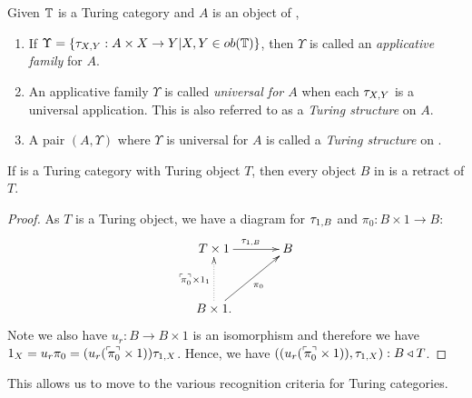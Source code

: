 \begin{definition}\label{def:turing_structure}
  Given $\mathbb{T}$ is a Turing category and $A$ is an object of \T,
  \begin{enumerate}
    \item If $\Upsilon=\{\tau_{{X},{Y}}: A\times X \to Y | X,Y \in ob(\mathbb{T})\}$, then $\Upsilon$ is called an
      \emph{applicative family} for $A$.
    \item An applicative family $\Upsilon$ is called \emph{universal for $A$} when each $\tau_{{X},{Y}}$ is
      a universal application. This is also referred to as a \emph{Turing structure} on $A$.
    \item A pair $(A,\Upsilon)$ where $\Upsilon$ is universal for $A$ is called a \emph{Turing
      structure} on \T.
  \end{enumerate}
\end{definition}

\begin{lemma}\label{lem:turing_object_is_retractable}
  If \T is a Turing category with Turing object $T$, then every object $B$ in \T is a retract of
  $T$.
\end{lemma}
\begin{proof}
  As $T$ is a Turing object, we have a diagram for $\tau_{{1},{B}}$ and $\pi_0:B\times 1 \to B$:
  \[
    \xymatrix@C+10pt@R+10pt{
      T\times 1 \ar[r]^{\tur{1}{B}} & B \\
      B\times 1. \ar@{.>}[u]^{\name{\pi_0}\times 1_1} \ar[ur]_{\pi_0}
    }
  \]
  Note we also have $u_r:B\to B\times 1$ is an
  isomorphism and therefore we have $1_X = u_r \pi_0 = (u_r ({}^\ulcorner\!\!\pi_0^\urcorner\times 1)) \tau_{{1},{X}}$. Hence, we
  have $((u_r ({}^\ulcorner\!\!\pi_0^\urcorner\times 1)), \tau_{{1},{X}}):B \triangleleft T$.
\end{proof}

This allows us to move to the various recognition criteria for Turing categories.

